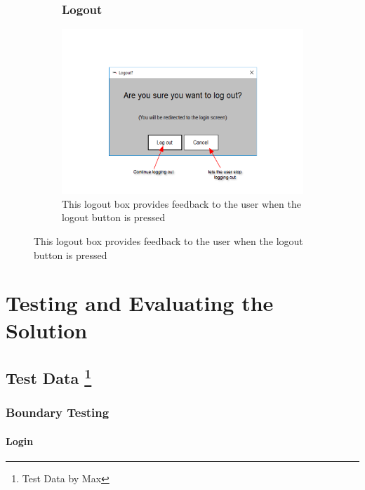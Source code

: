 \documentclass[oneside,openany,11pt,a4paper]{report}
\begin{document}
\begin{figure}[H]
\begin{subfigure}[t]{0.3\textwidth}
\end{subfigure}
~
\begin{subfigure}[t]{0.3\textwidth}
	\subsection{Logout}
	\centering
	
	\includegraphics[width=\textwidth]{screen/logout.png}
	\caption{This logout box provides feedback to the user when the logout button is pressed}
\end{subfigure}
\end{figure}





\chapter{Testing and Evaluating the Solution}
\section[Test Data]{Test Data \protect\footnote{Test Data by Max}}
\subsection{Boundary Testing}
\subsubsection{Login}
\end{document}
